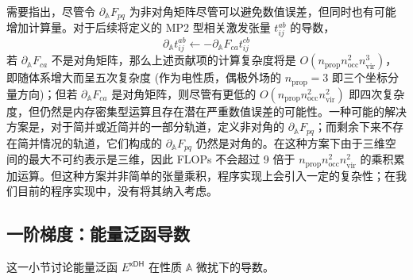需要指出，尽管令 $\partial_{\mathbb{A}} F_{pq}$ 为非对角矩阵尽管可以避免数值误差，但同时也有可能增加计算量。对于后续将定义的 MP2 型相关激发张量 $t_{ij}^{ab}$ 的导数，
\begin{equation*}
  \partial_{\mathbb{A}} t_{ij}^{ab} \leftarrow - \partial_{\mathbb{A}} F_{ca} t_{ij}^{cb}
\end{equation*}
若 $\partial_{\mathbb{A}} F_{ca}$ 不是对角矩阵，那么上述贡献项的计算复杂度将是 $O(n_\mathrm{prop} n_\mathrm{occ}^2 n_\mathrm{vir}^3)$，即随体系增大而呈五次复杂度 (作为电性质，偶极外场的 $n_\mathrm{prop} = 3$ 即三个坐标分量方向)；但若 $\partial_{\mathbb{A}} F_{ca}$ 是对角矩阵，则尽管有更低的 $O(n_\mathrm{prop} n_\mathrm{occ}^2 n_\mathrm{vir}^2)$ 即四次复杂度，但仍然是内存密集型运算且存在潜在严重数值误差的可能性。一种可能的解决方案是，对于简并或近简并的一部分轨道，定义非对角的 $\partial_{\mathbb{A}} F_{pq}$；而剩余下来不存在简并情况的轨道，它们构成的 $\partial_{\mathbb{A}} F_{pq}$ 仍然是对角的。在这种方案下由于三维空间的最大不可约表示是三维，因此 FLOPs 不会超过 9 倍于 $n_\mathrm{prop} n_\mathrm{occ}^2 n_\mathrm{vir}^2$ 的乘积累加运算\cite{Stoychev-Neese.JCTC.2018}。但这种方案并非简单的张量乘积，程序实现上会引入一定的复杂性；在我们目前的程序实现中，没有将其纳入考虑。

\subsection{一阶梯度：能量泛函导数}

这一小节讨论能量泛函 $E^\textsf{xDH}$ 在性质 $\mathbb{A}$ 微扰下的导数。

